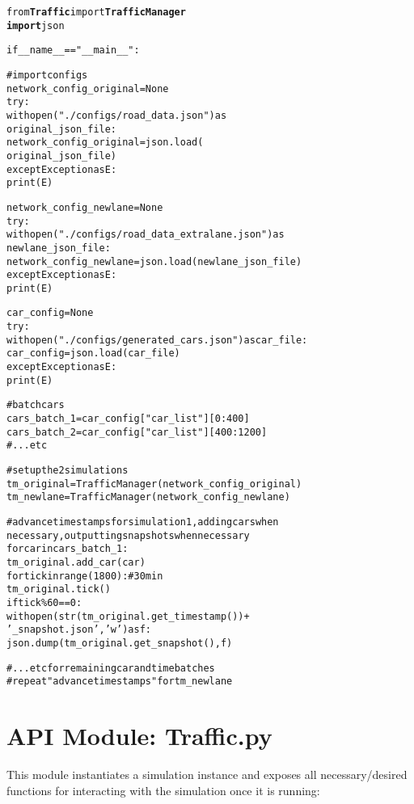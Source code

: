 \begin{alltt}
from \textbf{Traffic} import \textbf{TrafficManager}
\textbf{import} json

if __name__ == "__main__":

    # import configs
    network_config_original = None
    try:
        with open("./configs/road_data.json") as 
                  original_json_file: 
            network_config_original = json.load(
                                      original_json_file)
    except Exception as E:
        print(E)
        
    network_config_newlane = None
    try:
        with open("./configs/road_data_extralane.json") as 
                  newlane_json_file: 
            network_config_newlane = json.load(newlane_json_file)
    except Exception as E:
        print(E)

    car_config = None
    try:
        with open("./configs/generated_cars.json") as car_file:  
            car_config = json.load(car_file)
    except Exception as E:
        print(E)
        
    # batch cars
    cars_batch_1 = car_config["car_list"][0:400]
    cars_batch_2 = car_config["car_list"][400:1200]
    # ...etc
    
    # set up the 2 simulations
    tm_original = TrafficManager(network_config_original)
    tm_newlane = TrafficManager(network_config_newlane)
    
    # advance timestamps for simulation 1, adding cars when 
          necessary, outputting snapshots when necessary
    for car in cars_batch_1:
        tm_original.add_car(car)
    for tick in range(1800):     # 30 min
        tm_original.tick()
        if tick \% 60 == 0:
            with open(str(tm_original.get_timestamp()) + 
                          '_snapshot.json', 'w') as f:
                json.dump(tm_original.get_snapshot(), f)
    
    # ...etc for remaining car and time batches
    #  repeat "advance timestamps" for tm_newlane
\end{alltt}


\section{API Module: Traffic.py}
This module instantiates a simulation instance and exposes all necessary/desired functions for interacting with the simulation once it is running:


